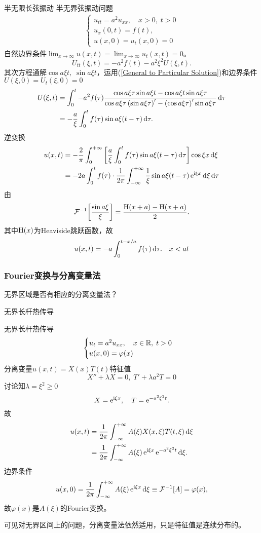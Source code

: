 \begin{example}{半无限长弦振动}{}
	半无界弦振动问题
	\begin{align*}
		\begin{cases}
			u_{tt}=a^2u_{xx},\quad x>0,\;t>0\\
			u_x(0,t)=f(t),\\ %
			u(x,0)=u_t(x,0)=0
		\end{cases}
	\end{align*}
	自然边界条件$\lim_{x\to\infty}u(x,t)=\lim_{x\to\infty}u_t(x,t)=0$。
	\[
		U_{tt}(\xi,t)=-a^2f(t)-a^2\xi^2U(\xi,t).
	\]
	其次方程通解$\cos a\xi t,\;\sin a\xi t$，运用(\ref{General to Particular Solution})和边界条件$U(\xi,0)=U_t(\xi,0)=0$
	\begin{align*}
		U(\xi,t)&=\int_0^t-a^2f(\tau)\frac{\cos a\xi\tau\sin a\xi t-\cos a\xi t\sin a\xi\tau}{\cos a\xi\tau\left(\sin a\xi\tau\right)'-\left(\cos a\xi\tau\right)'\sin a\xi\tau}\mathop{}\!\mathrm{d}\tau\\
		&=-\frac a\xi\int_0^tf(\tau)\sin a\xi(t-\tau)\mathop{}\!\mathrm{d}\tau.
	\end{align*}
	逆变换
	\begin{align*}
		u(x,t)&=-\frac{2}\pi\int_0^{+\infty}\left[\frac a\xi\int_0^tf(\tau)\sin a\xi(t-\tau)\mathop{}\!\mathrm{d}\tau\right]\cos \xi x\mathop{}\!\mathrm{d}\xi\\
		&=-2a\int_0^tf(\tau)\cdot\frac1{2\pi}\int_{-\infty}^{+\infty}\frac1\xi\sin a\xi(t-\tau)\mathop{}\!\mathrm{e}^{\mathrm{i}\xi x}\mathop{}\!\mathrm{d}\xi\mathop{}\!\mathrm{d}\tau
	\end{align*}
	由
	\[
		\mathcal F_\mathrm{\!\,}^{-1}\!\left[\frac{\sin a\xi}\xi\right]=\frac{\operatorname{H}(x+a)-\operatorname{H}(x+a)}2.
	\]
	其中$\operatorname{H}(x)$为Heaviside跳跃函数，故
	\begin{align*}
		u(x,t) %
		=-a\int_0^{t-x/a}f(\tau)\d\tau.\quad x<at
	\end{align*}
\end{example}
\subsubsection{Fourier变换与分离变量法}
无界区域是否有相应的分离变量法？
\begin{example}{无界长杆热传导}{}
	
	无界长杆热传导
	\begin{align*}
		\begin{cases}
			u_t=a^2u_{xx},\quad x\in\mathbb R,\;t>0\\
			u(x,0)=\varphi(x)
		\end{cases}
	\end{align*}
	分离变量$u(x,t)=X(x)T(t)$特征值
	\[
		X''+\lambda X=0,\;T'+\lambda a^2T=0
	\]
	讨论知$\lambda=\xi^2\geqslant 0$
	\[
		X=\mathop{}\!\mathrm{e}^{\mathrm{i}\xi x},\quad T=\mathop{}\!\mathrm{e}^{-a^2\xi^2t}.
	\]
	故
	\begin{align*}
		u(x,t)&=\frac1{2\pi}\int_{-\infty}^{+\infty} A(\xi)X(x,\xi)T(t,\xi)\mathop{}\!\mathrm{d}\xi\\
		&=\frac1{2\pi}\int_{-\infty}^{+\infty} A(\xi)\mathop{}\!\mathrm{e}^{\mathrm{i}\xi x}\mathop{}\!\mathrm{e}^{-a^2\xi^2t}\mathop{}\!\mathrm{d}\xi.
	\end{align*}
	边界条件
	\[
		u(x,0)=\frac1{2\pi}\int_{-\infty}^{+\infty} A(\xi)\mathop{}\!\mathrm{e}^{\mathrm{i}\xi x}\mathop{}\!\mathrm{d}\xi\equiv\mathcal F_\mathrm{\!\,}^{-1}\!\left[A\right]=\varphi(x),
	\]
	故$\varphi(x)$是$A(\xi)$的Fourier变换。
\end{example}
可见对无界区间上的问题，分离变量法依然适用，只是特征值是连续分布的。
